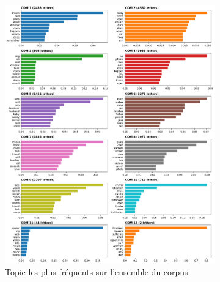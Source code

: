 \documentclass[12pt,a4paper,oneside,titlepage]{book} %
\begin{document}
	\begin{figure}[htbp]
	\centering
	\begin{subfigure}{0.45\textwidth}
		\includegraphics[width=\textwidth]{illustration/tf_idf_topic_corpus_variables.png}
		\caption{Topic les plus fréquents sur l'ensemble du corpus}
		\label{fig:topic_corpus}
	\end{subfigure}
	\hfill
	\begin{subfigure}{0.45\textwidth}

\end{subfigure}
\end{figure}
\end{document}
